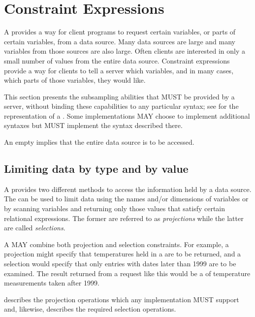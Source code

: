 \documentclass[justify]{nasa-ese}
\renewcommand{\new}[1]{\emph{#1}}
\begin{document}

\section{Constraint Expressions}
\label{sec-ce}

A \new{\CE} provides a way for \DAP client programs to request certain
variables, or parts of certain variables, from a data source. Many data
sources are large and many variables from those sources are also large. Often
clients are interested in only a small number of values from the entire data
source. Constraint expressions provide a way for clients to tell a server
which variables, and in many cases, which parts of those variables, they
would like.

This section presents the subsampling abilities that MUST be provided by a
\DAP server, without binding these capabilities to any particular
syntax; see  for the representation of a \CE. Some
implementations MAY choose to implement additional syntaxes but MUST
implement the syntax described there.

An empty \CE implies that the entire data source is to be accessed.

\subsection{Limiting data by type and by value}
\label{sec-ce-clauses}

A \CE provides two different methods to access the information held by
a data source. The \CE can be used to limit data using the names
and/or dimensions of variables or by scanning variables and returning
only those values that satisfy certain relational expressions. The
former are referred to as \new{projections} while the latter are
called \new{selections}.

A \CE MAY combine both projection and selection constraints. For example, a
projection might specify that temperatures held in a \Sequence are to be
returned, and a selection would specify that only \Sequence entries with
dates later than 1999 are to be examined. The result returned from a request
like this would be a \Sequence of temperature measurements taken after 1999.

 describes the projection operations which any
\DAP implementation MUST support and, likewise,
 describes the required selection operations.
\end{document}
